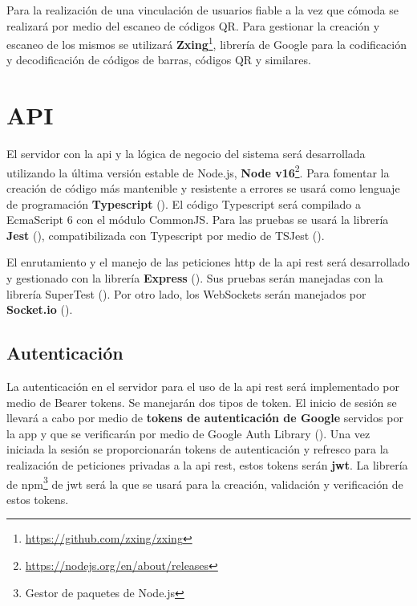 Para la realización de una vinculación de usuarios fiable a la vez que cómoda se realizará por medio del escaneo de códigos QR. Para gestionar la creación y escaneo de los mismos se utilizará \textbf{Zxing}\footnote{\href{https://github.com/zxing/zxing}{https://github.com/zxing/zxing}}, librería de Google para la codificación y decodificación de códigos de barras, códigos QR y similares.

\section{API}

El servidor con la \acrshort{api} y la lógica de negocio del sistema será desarrollada utilizando la última versión estable de Node.js, \textbf{Node v16}\footnote{\href{https://nodejs.org/en/about/releases}{https://nodejs.org/en/about/releases}}. Para fomentar la creación de código más mantenible y resistente a errores se usará como lenguaje de programación \textbf{Typescript} (). El código Typescript será compilado a EcmaScript 6\cite{ecma262} con el módulo CommonJS. Para las pruebas se usará la librería \textbf{Jest} (), compatibilizada con Typescript por medio de TSJest ().

El enrutamiento y el manejo de las peticiones \acrshort{http} de la \acrshort{api} \acrshort{rest} será desarrollado y gestionado con la librería \textbf{Express} (). Sus pruebas serán manejadas con la librería SuperTest (). Por otro lado, los WebSockets serán manejados por \textbf{Socket.io} ().

\subsection{Autenticación}

La autenticación en el servidor para el uso de la \acrshort{api} \acrshort{rest} será implementado por medio de Bearer tokens\cite{rfc6750}. Se manejarán dos tipos de token. El inicio de sesión se llevará a cabo por medio de \textbf{tokens de autenticación de Google} servidos por la app y que se verificarán por medio de Google Auth Library (). Una vez iniciada la sesión se proporcionarán tokens de autenticación y refresco para la realización de peticiones privadas a la \acrshort{api} \acrshort{rest}, estos tokens serán \textbf{\acrlong{jwt}}\cite{rfc7519}. La librería de \acrshort{npm}\footnote{Gestor de paquetes de Node.js} de \acrshort{jwt} será la que se usará para la creación, validación y verificación de estos tokens.

